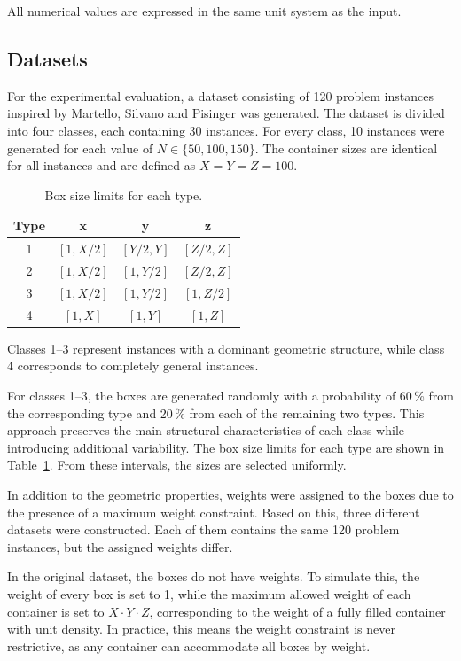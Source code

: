 All numerical values are expressed in the same unit system as the input.

\subsection{Datasets}
\label{sec:datasets}
For the experimental evaluation, a dataset consisting of 120 problem instances inspired by Martello, Silvano and Pisinger \cite{martello2000} was generated. 
The dataset is divided into four classes, each containing 30 instances. 
For every class, 10 instances were generated for each value of $N \in \{50, 100, 150\}$. The container sizes are identical for all instances and are defined as $X = Y = Z = 100$.

\begin{table}[htbp]
\centering
\begin{tabular}{|c|c|c|c|}
\hline
\textbf{Type} & \textbf{x} & \textbf{y} & \textbf{z} \\
\hline
1 & $[1, X/2]$ & $[Y/2, Y]$ & $[Z/2, Z]$ \\
2 & $[1, X/2]$ & $[1, Y/2]$ & $[Z/2, Z]$ \\
3 & $[1, X/2]$ & $[1, Y/2]$ & $[1, Z/2]$ \\
4 & $[1, X]$ & $[1, Y]$ & $[1, Z]$ \\
\hline
\end{tabular}
\caption{Box size limits for each type.}
\label{tab:box_types}
\end{table}

Classes 1–3 represent instances with a dominant geometric structure, while class 4 corresponds to completely general instances. 

For classes 1–3, the boxes are generated randomly with a probability of 60\,\% from the corresponding type and 20\,\% from each of the remaining two types. This approach preserves the main structural characteristics of each class while introducing additional variability.
The box size limits for each type are shown in Table~\ref{tab:box_types}. From these intervals, the sizes are selected uniformly.

In addition to the geometric properties, weights were assigned to the boxes due to the presence of a maximum weight constraint. Based on this, three different datasets were constructed. Each of them contains the same 120 problem instances, but the assigned weights differ.

In the original dataset, the boxes do not have weights. To simulate this, the weight of every box is set to 1, while 
the maximum allowed weight of each container is set to $X \cdot Y \cdot Z$, corresponding to the weight of a fully filled container with unit density. In practice, this means the weight constraint is never restrictive, as any container can accommodate all boxes by weight.

